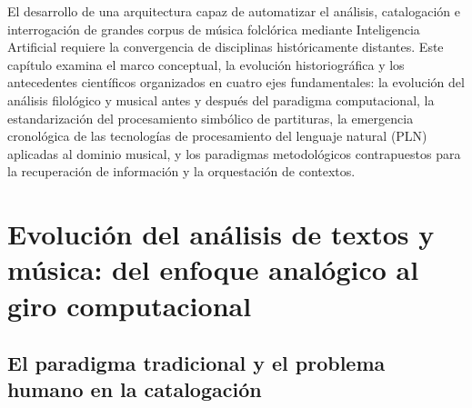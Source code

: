 
El desarrollo de una arquitectura capaz de automatizar el análisis, catalogación e interrogación de grandes corpus de música folclórica mediante Inteligencia Artificial requiere la convergencia de disciplinas históricamente distantes. Este capítulo examina el marco conceptual, la evolución historiográfica y los antecedentes científicos organizados en cuatro ejes fundamentales: la evolución del análisis filológico y musical antes y después del paradigma computacional, la estandarización del procesamiento simbólico de partituras, la emergencia cronológica de las tecnologías de procesamiento del lenguaje natural (PLN) aplicadas al dominio musical, y los paradigmas metodológicos contrapuestos para la recuperación de información y la orquestación de contextos.

\section{Evolución del análisis de textos y música: del enfoque analógico al giro computacional}
\label{sec:evolucion_analisis}

\subsection{El paradigma tradicional y el problema humano en la catalogación}


